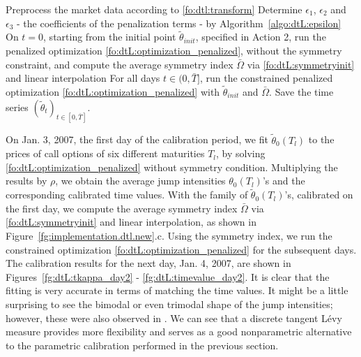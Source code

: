 \documentclass{article}
\numberwithin{equation}{section}
\def\bT{\bar{T}}
\def\bOmega{\bar{\Omega}}
\begin{document}
\begin{algorithm}[H]
\label{algo:dtL:calibration}
\caption{Algorithm for fitting $\tilde{\theta}$}
Preprocess the market data according to \eqref{fo:dtl:transform}\;
Determine $\epsilon_1$, $\epsilon_2$ and $\epsilon_3$ - the coefficients of the penalization terms - by Algorithm~\ref{algo:dtL:epsilon}\;
On $t=0$, starting from the initial point $\tilde{\theta}_{init}$, specified in Action 2, run the penalized optimization \eqref{fo:dtL:optimization_penalized}, without the symmetry constraint, and compute the average symmetry index $\bOmega$ via \eqref{fo:dtL:symmetryinit} and linear interpolation\;
For all days $t \in (0,\bT]$, run the constrained penalized optimization \eqref{fo:dtL:optimization_penalized} with $\tilde{\theta}_{init}$ and $\bOmega$. Save the time series $(\tilde{\theta}_t)_{t \in [0,\bT]}$.
\end{algorithm}


On Jan. 3, 2007, the first day of the calibration period, we fit $\tilde{\theta}_0(T_l)$ to the prices of call options of six different maturities $T_l$, by solving \eqref{fo:dtL:optimization_penalized} without symmetry condition. 
Multiplying the results by $\rho$, we obtain the average jump intensities $\theta_0(T_l)$'s and the corresponding calibrated time values.
With the family of $\tilde{\theta}_0(T_l)$'s, calibrated on the first day, we compute the average symmetry index $\bOmega$ via \eqref{fo:dtL:symmetryinit} and linear interpolation, as shown in Figure~\ref{fg:implementation.dtl.new}.c. Using the symmetry index, we run the constrained optimization \eqref{fo:dtL:optimization_penalized} for the subsequent days. The calibration results for the next day, Jan. 4, 2007, are shown in Figures~\ref{fg:dtL:tkappa_day2} - \ref{fg:dtL:timevalue_day2}. It is clear that the fitting is very accurate in terms of matching the time values. It might be a little surprising to see the bimodal or even trimodal shape of the jump intensities; however, these were also observed in \cite{Cont2004nonparametriccalibration}. We can see that a discrete tangent L\'evy measure provides more flexibility and serves as a good nonparametric alternative to the parametric calibration performed in the previous section. 
\end{document}
